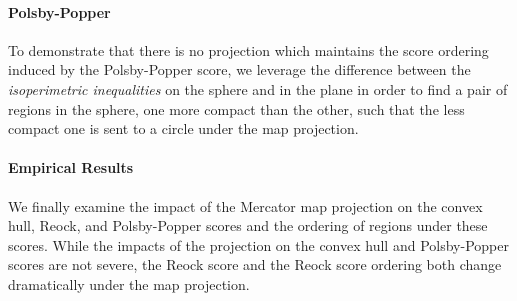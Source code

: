 \paragraph{Polsby-Popper}
To demonstrate that there is no projection which maintains the score ordering induced by the Polsby-Popper score,  we leverage the 
difference between the \textit{isoperimetric inequalities} on the sphere and in the plane in order to find a pair of regions in the sphere, one more compact than the other, such that the less compact one is sent to a circle under the map projection.

\paragraph{Empirical Results}
We finally examine the impact of the Mercator map projection on the convex hull, Reock, and Polsby-Popper 
scores and the ordering of regions under these scores.  While the impacts of the projection on the convex hull and 
 Polsby-Popper scores are not severe, the Reock score and the Reock score ordering both change dramatically 
 under the map projection.




